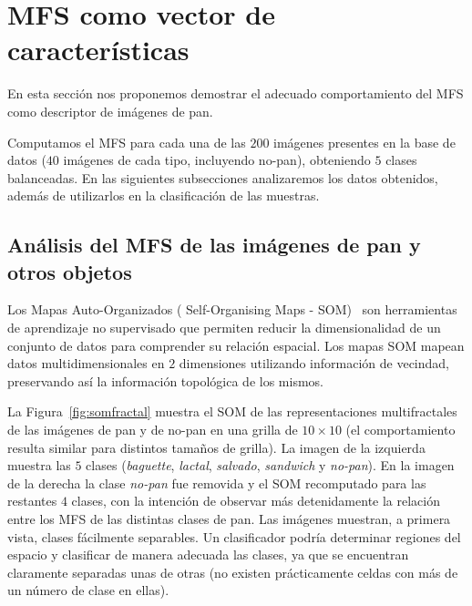 \section{MFS como vector de características}

En esta sección nos proponemos demostrar el adecuado comportamiento del MFS como descriptor de imágenes de pan.

Computamos el MFS para cada una de las $200$ imágenes presentes en la base de datos ($40$ imágenes de cada tipo, incluyendo no-pan), obteniendo $5$ clases balanceadas.
En las siguientes subsecciones analizaremos los datos obtenidos, además de utilizarlos en la clasificación de las muestras.

\subsection{Análisis del MFS de las imágenes de pan y otros objetos}

Los Mapas Auto-Organizados ( Self-Organising Maps -  \acrshort{SOM})~\cite{Kohonen2001} son herramientas de aprendizaje no supervisado que permiten reducir la dimensionalidad de un conjunto de datos para comprender su relación espacial.
Los mapas SOM mapean datos multidimensionales en $2$ dimensiones utilizando información de vecindad, preservando así la información topológica de los mismos.

La Figura~\ref{fig:somfractal} muestra el  SOM de las representaciones multifractales de las imágenes de pan y de no-pan en una grilla de $10\times 10$ (el comportamiento resulta similar para distintos tamaños de grilla).
La imagen de la izquierda muestra las $5$ clases ({\em baguette}, {\em lactal}, {\em salvado}, {\em sandwich} y {\em no-pan}).
En la imagen de la derecha la clase {\em no-pan} fue removida y el SOM recomputado para las restantes $4$ clases, con la intención de observar más detenidamente la relación entre los MFS de las distintas clases de pan.
Las imágenes muestran, a primera vista, clases fácilmente separables.
Un clasificador podría determinar regiones del espacio y clasificar de manera adecuada las clases, ya que se encuentran claramente separadas unas de otras (no existen prácticamente celdas con más de un número de clase en ellas).

